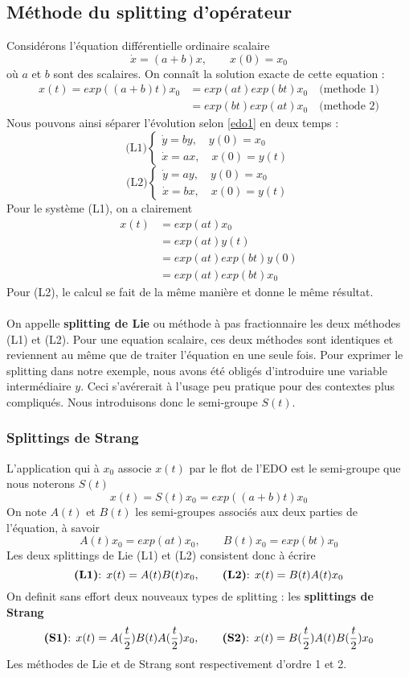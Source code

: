 \subsection{Méthode du splitting d’opérateur}
Considérons l’équation différentielle ordinaire scalaire
\begin{equation} \label{edo1}
\dot{x}=(a+b)x, \quad \quad x(0)=x_0
\end{equation}
où $a$ et $b$ sont des scalaires. On connaît la solution exacte de cette equation :
\begin{align*}
x(t)=exp((a+b)t)x_0 &= exp(at)exp(bt)x_0 \quad \mbox{(methode 1)}\\
&= exp(bt)exp(at)x_0 \quad \mbox{(methode 2)}
\end{align*}
Nous pouvons ainsi séparer l'évolution selon \eqref{edo1} en deux temps :
$$\mbox{(L1)}
\begin{cases}
\dot{y}=by,\quad y(0)=x_0\\
\dot{x}=ax,\quad x(0)=y(t)
\end{cases}
$$
$$\mbox{(L2)}
\begin{cases}
\dot{y}=ay,\quad y(0)=x_0\\
\dot{x}=bx,\quad x(0)=y(t)
\end{cases}
$$
Pour le système (L1), on a clairement
\begin{align*}
x(t) &= exp(at)x_0\\
&= exp(at)y(t)\\
&= exp(at)exp(bt)y(0)\\
&= exp(at)exp(bt)x_0
\end{align*}
Pour (L2), le calcul se fait de la même manière et donne le même résultat.\\\\
On appelle \textbf{splitting de Lie} ou méthode à pas fractionnaire les deux méthodes (L1) et (L2). Pour une equation scalaire, ces deux méthodes sont identiques et reviennent au même que de traiter l’équation en une seule fois.
Pour exprimer le splitting dans notre exemple, nous avons été obligés d’introduire une variable intermédiaire $y$. Ceci s’avérerait à l’usage peu pratique pour des contextes plus compliqués. Nous introduisons donc le semi-groupe $S(t)$.

\subsubsection{Splittings de Strang}
L’application qui à $x_0$ associe $x(t)$ par le flot de l’EDO est le semi-groupe que nous noterons $S(t)$
\begin{equation}
x(t)=S(t)x_0=exp((a+b)t)x_0
\end{equation}
On note $A(t)$ et $B(t)$ les semi-groupes associés aux deux parties de l’équation, à savoir
$$
A(t)x_0=exp(at)x_0, \quad \quad B(t)x_0=exp(bt)x_0
$$
Les deux splittings de Lie (L1) et (L2) consistent donc à écrire
$$
\mbox{\textbf{(L1)}: } x(t)=A(t)B(t)x_0, \quad \quad \mbox{\textbf{(L2)}: } x(t)=B(t)A(t)x_0
$$
On definit sans effort deux nouveaux types de splitting : les \textbf{splittings de Strang} \cite{Strang}
$$
\mbox{\textbf{(S1)}: } x(t)=A(\dfrac{t}{2})B(t)A(\dfrac{t}{2})x_0, \quad \quad \mbox{\textbf{(S2)}: } x(t)=B(\dfrac{t}{2})A(t)B(\dfrac{t}{2})x_0
$$
Les méthodes de Lie et de Strang sont respectivement d’ordre 1 et 2.
